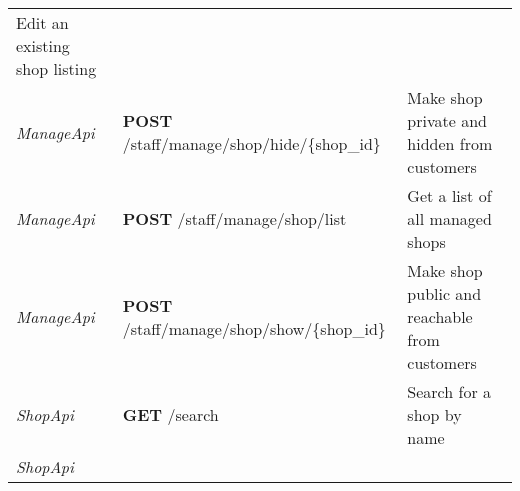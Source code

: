 \begin{longtable}[]{@{}lll@{}}
\begin{minipage}[t]{0.31\columnwidth}
Edit an existing shop listing\strut
\end{minipage}\tabularnewline
\begin{minipage}[t]{0.29\columnwidth}\raggedright
\emph{ManageApi}\strut
\end{minipage} & \begin{minipage}[t]{0.31\columnwidth}\raggedright
\textbf{POST} /staff/manage/shop/hide/\{shop\_id\}\strut
\end{minipage} & \begin{minipage}[t]{0.31\columnwidth}\raggedright
Make shop private and hidden from customers\strut
\end{minipage}\tabularnewline
\begin{minipage}[t]{0.29\columnwidth}\raggedright
\emph{ManageApi}\strut
\end{minipage} & \begin{minipage}[t]{0.31\columnwidth}\raggedright
\textbf{POST} /staff/manage/shop/list\strut
\end{minipage} & \begin{minipage}[t]{0.31\columnwidth}\raggedright
Get a list of all managed shops\strut
\end{minipage}\tabularnewline
\begin{minipage}[t]{0.29\columnwidth}\raggedright
\emph{ManageApi}\strut
\end{minipage} & \begin{minipage}[t]{0.31\columnwidth}\raggedright
\textbf{POST} /staff/manage/shop/show/\{shop\_id\}\strut
\end{minipage} & \begin{minipage}[t]{0.31\columnwidth}\raggedright
Make shop public and reachable from customers\strut
\end{minipage}\tabularnewline
\begin{minipage}[t]{0.29\columnwidth}\raggedright
\emph{ShopApi}\strut
\end{minipage} & \begin{minipage}[t]{0.31\columnwidth}\raggedright
\textbf{GET} /search\strut
\end{minipage} & \begin{minipage}[t]{0.31\columnwidth}\raggedright
Search for a shop by name\strut
\end{minipage}\tabularnewline
\begin{minipage}[t]{0.29\columnwidth}\raggedright
\emph{ShopApi}\strut
\end{minipage} & \begin{minipage}[t]{0.31\columnwidth}\raggedright

\end{minipage}
\end{longtable}

